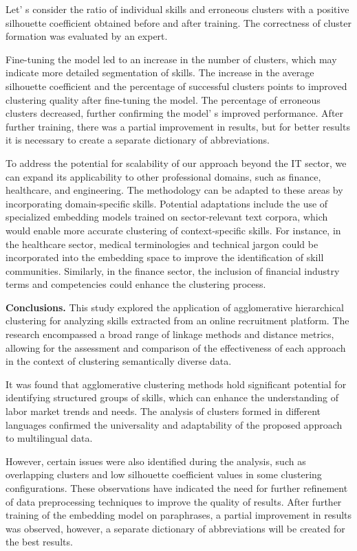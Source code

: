\begin{multicols}{2}
Let' s consider the ratio of individual skills and
erroneous clusters with a positive silhouette coefficient obtained
before and after training. The correctness of cluster formation was
evaluated by an expert.

Fine-tuning the model led to an increase in the number of clusters,
which may indicate more detailed segmentation of skills. The increase in
the average silhouette coefficient and the percentage of successful
clusters points to improved clustering quality after fine-tuning the
model. The percentage of erroneous clusters decreased, further
confirming the model' s improved performance. After
further training, there was a partial improvement in results, but for
better results it is necessary to create a separate dictionary of
abbreviations.

To address the potential for scalability of our approach beyond the IT
sector, we can expand its applicability to other professional domains,
such as finance, healthcare, and engineering. The methodology can be
adapted to these areas by incorporating domain-specific skills.
Potential adaptations include the use of specialized embedding models
trained on sector-relevant text corpora, which would enable more
accurate clustering of context-specific skills. For instance, in the
healthcare sector, medical terminologies and technical jargon could be
incorporated into the embedding space to improve the identification of
skill communities. Similarly, in the finance sector, the inclusion of
financial industry terms and competencies could enhance the clustering
process.

{\bfseries Conclusions.} This study explored the application of
agglomerative hierarchical clustering for analyzing skills extracted
from an online recruitment platform. The research encompassed a broad
range of linkage methods and distance metrics, allowing for the
assessment and comparison of the effectiveness of each approach in the
context of clustering semantically diverse data.

It was found that agglomerative clustering methods hold significant
potential for identifying structured groups of skills, which can enhance
the understanding of labor market trends and needs. The analysis of
clusters formed in different languages confirmed the universality and
adaptability of the proposed approach to multilingual data.

However, certain issues were also identified during the analysis, such
as overlapping clusters and low silhouette coefficient values in some
clustering configurations. These observations have indicated the need
for further refinement of data preprocessing techniques to improve the
quality of results. After further training of the embedding model on
paraphrases, a partial improvement in results was observed, however, a
separate dictionary of abbreviations will be created for the best
results.


\end{multicols}
